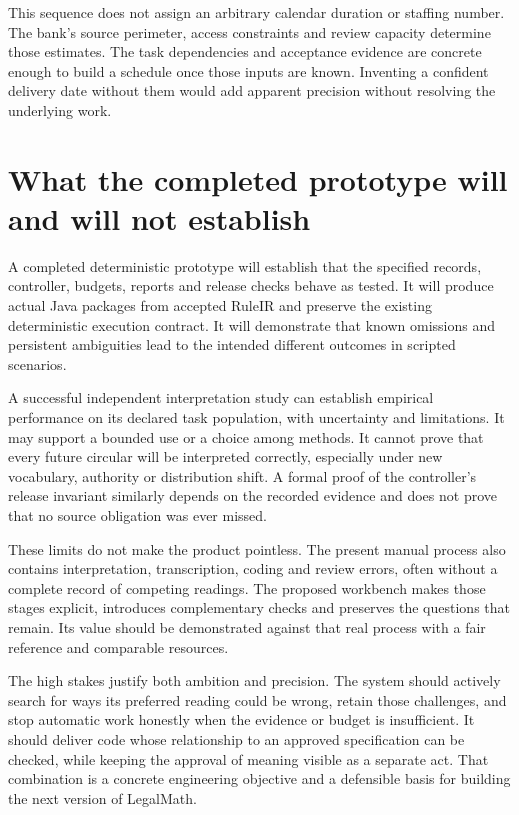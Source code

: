 \documentclass[12pt,a4paper,oneside,openany]{book}
\begin{document}
This sequence does not assign an arbitrary calendar duration or staffing number.
The bank's source perimeter, access constraints and review capacity determine
those estimates. The task dependencies and acceptance evidence are concrete enough
to build a schedule once those inputs are known. Inventing a confident delivery
date without them would add apparent precision without resolving the underlying
work.

\section{What the completed prototype will and will not establish}

A completed deterministic prototype will establish that the specified records,
controller, budgets, reports and release checks behave as tested. It will produce
actual Java packages from accepted RuleIR and preserve the existing deterministic
execution contract. It will demonstrate that known omissions and persistent
ambiguities lead to the intended different outcomes in scripted scenarios.

A successful independent interpretation study can establish empirical performance
on its declared task population, with uncertainty and limitations. It may support
a bounded use or a choice among methods. It cannot prove that every future
circular will be interpreted correctly, especially under new vocabulary,
authority or distribution shift. A formal proof of the controller's release
invariant similarly depends on the recorded evidence and does not prove that no
source obligation was ever missed.

These limits do not make the product pointless. The present manual process also
contains interpretation, transcription, coding and review errors, often without a
complete record of competing readings. The proposed workbench makes those stages
explicit, introduces complementary checks and preserves the questions that remain.
Its value should be demonstrated against that real process with a fair reference
and comparable resources.

The high stakes justify both ambition and precision. The system should actively
search for ways its preferred reading could be wrong, retain those challenges,
and stop automatic work honestly when the evidence or budget is insufficient.
It should deliver code whose relationship to an approved specification can be
checked, while keeping the approval of meaning visible as a separate act.
That combination is a concrete engineering objective and a defensible basis for
building the next version of LegalMath.

\backmatter
\begingroup
\raggedright


\endgroup
\end{document}
